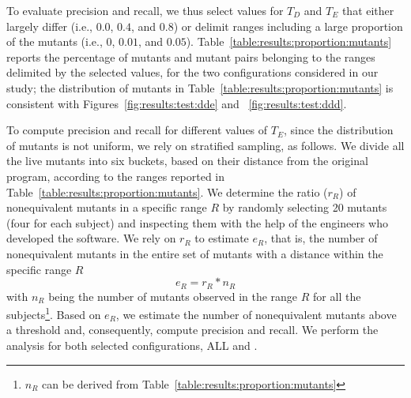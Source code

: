 To evaluate precision and recall, we thus select values for $T_D$ and $T_E$ that 
either largely differ (i.e., $0.0$, $0.4$, and $0.8$) or delimit ranges including a large proportion of the mutants (i.e., $0$, $0.01$, and $0.05$). Table~\ref{table:results:proportion:mutants} reports the percentage of mutants and mutant pairs belonging to the ranges delimited by the selected values, for the two configurations considered in our study; the distribution of mutants in Table~\ref{table:results:proportion:mutants} is consistent with Figures~\ref{fig:results:test:dde} and
~\ref{fig:results:test:ddd}.









To compute precision and recall for different values of $T_E$, since the distribution of mutants is not uniform, we rely on stratified sampling, as follows. 
We divide all the live mutants into six buckets, based on their distance from the original program, according to the ranges reported in Table~\ref{table:results:proportion:mutants}. 
We determine the ratio ($r_R$) of nonequivalent mutants in a specific range $R$ by randomly selecting 20 mutants (four for each subject) and inspecting them with the help of the engineers who developed the software. 
We rely on $r_R$ to estimate $e_{R}$, that is, the number of nonequivalent mutants in the entire set of mutants with a distance within the specific  range $R$
$$e_R = r_R * n_R$$
with $n_R$ being the number of mutants observed in the range $R$ for all the subjects\footnote{$n_R$ can be derived from Table~\ref{table:results:proportion:mutants}}.
Based on $e_R$, we estimate the number of nonequivalent mutants above a threshold and, consequently, compute precision and recall. We perform the analysis for both selected configurations,  ALL and \APPR.

